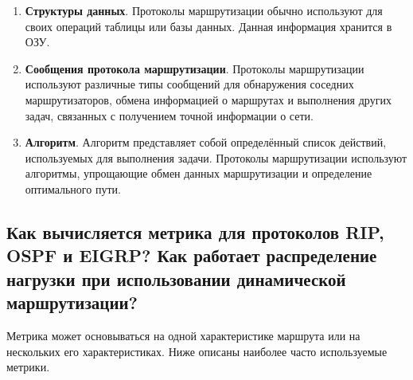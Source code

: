 \begin{enumerate}
    \item \textbf{Структуры данных}. Протоколы маршрутизации обычно используют
    для своих операций таблицы или базы данных.
    Данная информация хранится в ОЗУ.
    \item \textbf{Сообщения протокола маршрутизации}.
    Протоколы маршрутизации используют различные типы сообщений
    для обнаружения соседних маршрутизаторов,
    обмена информацией о маршрутах и выполнения других задач,
    связанных с получением точной информации о сети.
    \item \textbf{Алгоритм}. Алгоритм представляет собой определённый
    список действий, используемых для выполнения задачи.
    Протоколы маршрутизации используют алгоритмы,
    упрощающие обмен данных маршрутизации и определение оптимального пути.
\end{enumerate}

\subsection{Как вычисляется метрика для протоколов RIP, OSPF и EIGRP?
Как работает распределение нагрузки
при использовании динамической маршрутизации?}

Метрика может основываться на одной характеристике маршрута или на нескольких его характеристиках. Ниже описаны наиболее часто используемые метрики.

